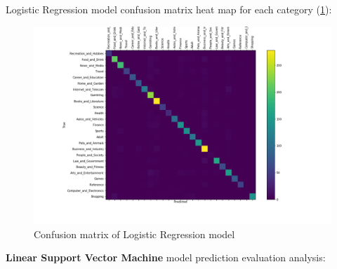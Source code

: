 \begin{enumerate}
    
    Logistic Regression model confusion matrix heat map for each category (\ref{fig:lr_confusion_matrix}):
    \begin{figure}[H]
        \centering
        \includegraphics[width=1.2\textwidth]{Pictures/lr_confusion_matrix.png}
        \caption{\label{fig:lr_confusion_matrix}{} Confusion matrix of Logistic Regression model}
    \end{figure}
    
    \pagebreak
    \textbf{Linear Support Vector Machine} model prediction evaluation analysis:
    

\end{enumerate}
